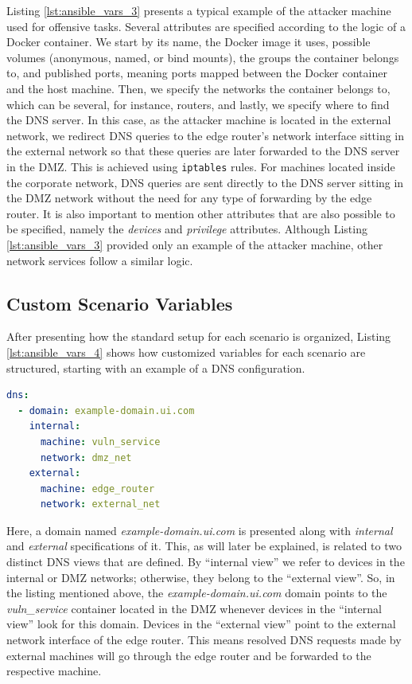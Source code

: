 Listing \ref{lst:ansible_vars_3} presents a typical example of the attacker machine used for offensive tasks. Several attributes are specified according to the logic of a Docker container. We start by its name, the Docker image it uses, possible volumes (anonymous, named, or bind mounts), the groups the container belongs to, and published ports, meaning ports mapped between the Docker container and the host machine. Then, we specify the networks the container belongs to, which can be several, for instance, routers, and lastly, we specify where to find the DNS server. In this case, as the attacker machine is located in the external network, we redirect DNS queries to the edge router's network interface sitting in the external network so that these queries are later forwarded to the DNS server in the DMZ. This is achieved using \texttt{iptables} rules. For machines located inside the corporate network, DNS queries are sent directly to the DNS server sitting in the DMZ network without the need for any type of forwarding by the edge router. It is also important to mention other attributes that are also possible to be specified, namely the \textit{devices} and \textit{privilege} attributes. Although Listing \ref{lst:ansible_vars_3} provided only an example of the attacker machine, other network services follow a similar logic.

\subsection{Custom Scenario Variables} \label{sec:custom_scenario_variables}

After presenting how the standard setup for each scenario is organized, Listing \ref{lst:ansible_vars_4} shows how customized variables for each scenario are structured, starting with an example of a DNS configuration.

\begin{lstlisting}[language=yaml,caption=Ansible Variables - DNS.,numbers=none,label={lst:ansible_vars_4}]
dns:
  - domain: example-domain.ui.com
    internal:
      machine: vuln_service
      network: dmz_net
    external:
      machine: edge_router
      network: external_net
\end{lstlisting}

Here, a domain named \textit{example-domain.ui.com} is presented along with \textit{internal} and \textit{external} specifications of it. This, as will later be explained, is related to two distinct DNS views that are defined. By ``internal view'' we refer to devices in the internal or DMZ networks; otherwise, they belong to the ``external view''. So, in the listing mentioned above, the \textit{example-domain.ui.com} domain points to the \textit{vuln\_service} container located in the DMZ whenever devices in the ``internal view'' look for this domain. Devices in the ``external view'' point to the external network interface of the edge router. This means resolved DNS requests made by external machines will go through the edge router and be forwarded to the respective machine. 

